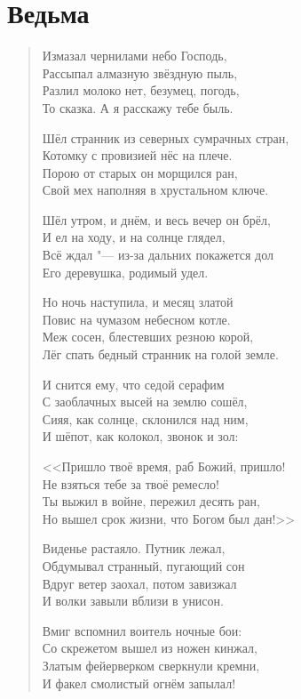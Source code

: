 \documentclass[a4paper,12pt]{article}
\newcommand{\ldotst}{\so{...}\xspace}
\begin{document}
\section{Ведьма}

\begin{verse}
Измазал чернилами небо Господь,\\
Рассыпал алмазную звёздную пыль,\\
Разлил молоко\ldotst нет, безумец, погодь,\\
То сказка. А я расскажу тебе быль.

Шёл странник из северных сумрачных стран,\\
Котомку с провизией нёс на плече.\\
Порою от старых он морщился ран,\\
Свой мех наполняя в хрустальном ключе.

Шёл утром, и днём, и весь вечер он брёл,\\
И ел на ходу, и на солнце глядел,\\
Всё ждал "--- из-за дальних покажется дол\\
Его деревушка, родимый удел.

Но ночь наступила, и месяц златой\\
Повис на чумазом небесном котле.\\
Меж сосен, блестевших резною корой,\\
Лёг спать бедный странник на голой земле.

И снится ему, что седой серафим\\
С заоблачных высей на землю сошёл,\\
Сияя, как солнце, склонился над ним,\\
И шёпот, как колокол, звонок и зол:

<<Пришло твоё время, раб Божий, пришло!\\
Не взяться тебе за твоё ремесло!\\
Ты выжил в войне, пережил десять ран,\\
Но вышел срок жизни, что Богом был дан!>>

Виденье растаяло. Путник лежал,\\
Обдумывал странный, пугающий сон\ldotst\\
Вдруг ветер заохал, потом завизжал\ldotst\\
И волки завыли вблизи в унисон.

Вмиг вспомнил воитель ночные бои:\\
Со скрежетом вышел из ножен кинжал,\\
Златым фейерверком сверкнули кремни,\\ 
И факел смолистый огнём запылал!


\end{verse}
\end{document}
